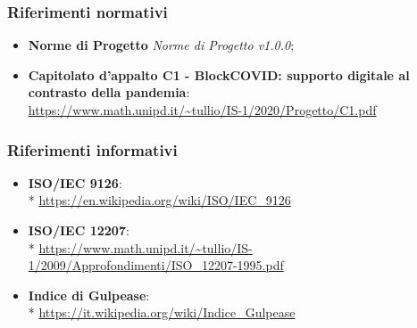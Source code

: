 \subsubsection{Riferimenti normativi}
\begin{itemize}
    \item \textbf{Norme di Progetto} \textit{Norme di Progetto v1.0.0};
    \item \textbf{Capitolato d'appalto C1 - BlockCOVID: supporto digitale al contrasto della pandemia}: \\ \url{https://www.math.unipd.it/~tullio/IS-1/2020/Progetto/C1.pdf}
\end{itemize}
\subsubsection{Riferimenti informativi}
\begin{itemize}
    \item \textbf{ISO/IEC 9126}: \\* \url{https://en.wikipedia.org/wiki/ISO/IEC_9126}
    \item \textbf{ISO/IEC 12207}: \\* 
    \url{https://www.math.unipd.it/~tullio/IS-1/2009/Approfondimenti/ISO\_12207-1995.pdf}
    \item \textbf{Indice di Gulpease}: \\* \url{https://it.wikipedia.org/wiki/Indice_Gulpease}
\end{itemize}
